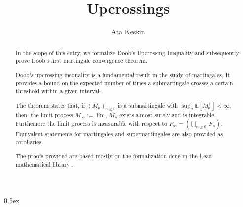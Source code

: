 \documentclass[11pt,a4paper]{article}
\begin{document}
\title{Upcrossings}
\author{Ata Keskin}
\maketitle

\begin{abstract}
In the scope of this entry, we formalize Doob's Upcrossing Inequality and subsequently prove Doob's first martingale convergence theorem. 

Doob's upcrossing inequality is a fundamental result in the study of martingales. It provides a bound on the expected number of times a submartingale crosses a certain threshold within a given interval.

The theorem states that, if $(M_n)_{n \ge 0}$ is a submartingale with $\sup_n \mathbb{E}[M^{+}_n] < \infty$, then, the limit process $M_\infty := \lim_n M_n$ exists almost surely and is integrable. Furthemore the limit process is measurable with respect to $F_\infty = (\bigcup_{n \ge 0}. F_n)$. Equivalent statements for martingales and supermartingales are also provided as corollaries.

The proofs provided are based mostly on the formalization done in the Lean mathematical library \cite{ying2022formalization}.
\end{abstract}

\tableofcontents

\parindent 0pt\parskip 0.5ex





\end{document}
